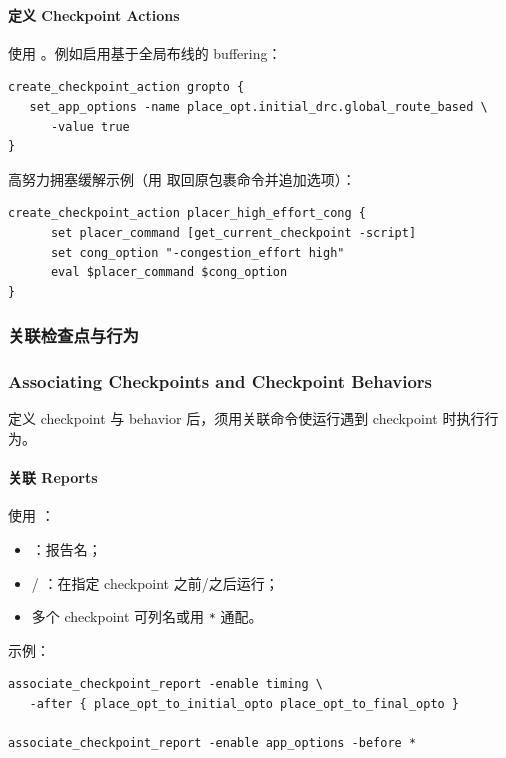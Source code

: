 \paragraph{定义 Checkpoint Actions}
使用 。例如启用基于全局布线的 buffering：
\begin{lstlisting}
create_checkpoint_action gropto {
   set_app_options -name place_opt.initial_drc.global_route_based \
      -value true
}
\end{lstlisting}

高努力拥塞缓解示例（用  取回原包裹命令并追加选项）：
\begin{lstlisting}
create_checkpoint_action placer_high_effort_cong {
      set placer_command [get_current_checkpoint -script]
      set cong_option "-congestion_effort high"
      eval $placer_command $cong_option
}
\end{lstlisting}

\subsubsection{关联检查点与行为}
\subsubsection*{Associating Checkpoints and Checkpoint Behaviors}

定义 checkpoint 与 behavior 后，须用关联命令使运行遇到 checkpoint 时执行行为。

\paragraph{关联 Reports}
使用 ：
\begin{itemize}
  \item {}：报告名；
  \item {} / ：在指定 checkpoint 之前/之后运行；
  \item 多个 checkpoint 可列名或用 \texttt{*} 通配。
\end{itemize}

示例：
\begin{lstlisting}
associate_checkpoint_report -enable timing \
   -after { place_opt_to_initial_opto place_opt_to_final_opto }

associate_checkpoint_report -enable app_options -before *
\end{lstlisting}

